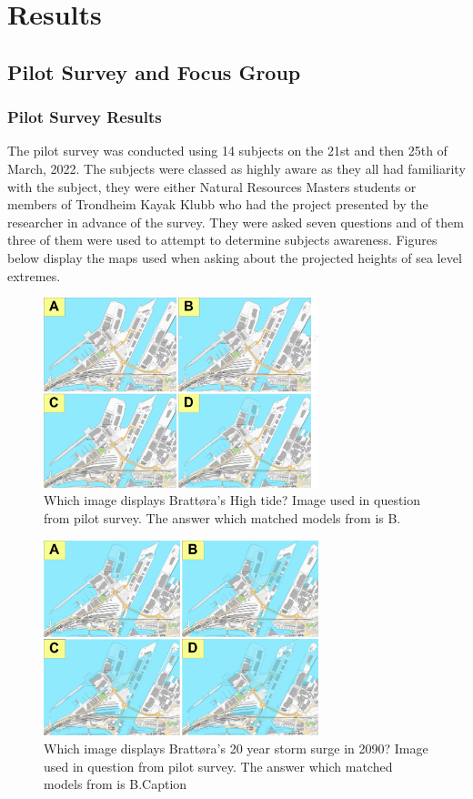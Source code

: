 \chapter{Results}

\section{Pilot Survey and Focus Group}

\subsection{Pilot Survey Results}
The pilot survey was conducted using 14 subjects on the 21st and then 25th of March, 2022. The subjects were classed as highly aware as they all had familiarity with the subject, they were either Natural Resources Masters students or members of Trondheim Kayak Klubb who had the project presented by the researcher in advance of the survey. They were asked seven questions and of them three of them were used to attempt to determine subjects awareness. Figures below display the maps used when asking about the projected heights of sea level extremes.

\begin{figure} [h]
    \centering
    \includegraphics[width=8cm]{fig/brattora question on 2022 high tide quadrant.png}
    \caption{Which image displays Brattøra's High tide? Image used in question from pilot survey. The answer which matched models from \cite{kartverket_se_2021} is B.}
    \label{fig:Brattora_2022_hightide}
\end{figure}

\begin{figure}[h]
    \centering
    \includegraphics[width=8cm]{fig/brattora question on 2090 20 yr storm surge quadrant.png} 
    \caption{Which image displays Brattøra's 20 year storm surge in 2090? Image used in question from pilot survey. The answer which matched models from \cite{kartverket_se_2021} is B.Caption}
    \label{fig:brattora_2090_stormsurge}
\end{figure}

